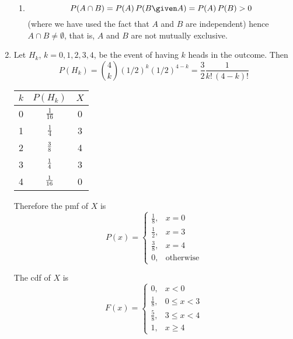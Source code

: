 \documentclass[12pt]{article}
\begin{document}
\begin{enumerate}
\begin{enumerate}
\item
\[
P(A\cap B)
= P(A)\, P(B\given A)
= P(A)\, P(B)
> 0
\]
(where we have used the fact that
$A$ and $B$ are independent)
hence
$A\cap B \ne \emptyset$,
that is,
$A$ and $B$ are not mutually exclusive.
\end{enumerate}

\item
Let $H_k$, $k=0,1,2,3,4$,
be the event of having $k$ heads in the outcome.
Then
\[
P(H_k)
= {4\choose k} (1/2)^k (1/2)^{4-k}
= \frac{3}{2} \frac{1}{k!\,(4-k)!}
\]

\begin{center}
\begin{tabular}{ccc}
$k$ & $P(H_k)$ & $X$ \\ \hline
0   & $\frac{1}{16}$  & 0 \\[5pt]
1   & $\frac{1}{4}$  & 3 \\[5pt]
2   & $3\over 8$  & 4 \\[5pt]
3   & $1\over 4$  & 3 \\[5pt]
4   & $1\over 16$  & 0 \\ \hline
\end{tabular}
\end{center}

Therefore the pmf of $X$ is
\[
P(x) = \begin{cases}
    \frac{1}{8},   & x = 0\\
    \frac{1}{2},   & x = 3\\
    \frac{3}{8},   & x = 4\\
    0,             & \text{otherwise}
    \end{cases}
\]

The cdf of $X$ is
\[
F(x) = \begin{cases}
    0,            & x < 0\\
    \frac{1}{8},  & 0 \le x < 3\\
    \frac{5}{8},  & 3 \le x < 4\\
    1,            & x \ge 4
    \end{cases}
\]

\end{enumerate}
\end{document}
